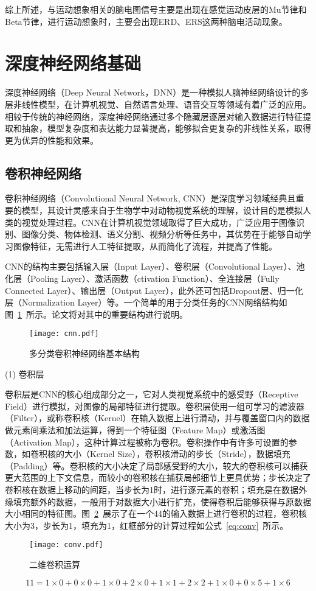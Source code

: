 综上所述，与运动想象相关的脑电图信号主要是出现在感觉运动皮层的Mu节律和Beta节律，进行运动想象时，主要会出现ERD、ERS这两种脑电活动现象。

\section{深度神经网络基础}

深度神经网络（Deep Neural Network，DNN）是一种模拟人脑神经网络设计的多层非线性模型，在计算机视觉、自然语言处理、语音交互等领域有着广泛的应用。相较于传统的神经网络，深度神经网络通过多个隐藏层逐层对输入数据进行特征提取和抽象，模型复杂度和表达能力显著提高，能够拟合更复杂的非线性关系，取得更为优异的性能和效果。

\subsection{卷积神经网络}

卷积神经网络（Convolutional Neural Network, CNN）是深度学习领域经典且重要的模型，其设计灵感来自于生物学中对动物视觉系统的理解，设计目的是模拟人类的视觉处理过程。CNN在计算机视觉领域取得了巨大成功，广泛应用于图像识别、图像分类、物体检测、语义分割、视频分析等任务中，其优势在于能够自动学习图像特征，无需进行人工特征提取，从而简化了流程，并提高了性能。

CNN的结构主要包括输入层（Input Layer）、卷积层（Convolutional Layer）、池化层（Pooling Layer）、激活函数（ctivation Function）、全连接层（Fully Connected Layer）、输出层（Output Layer），此外还可包括Dropout层、归一化层（Normalization Layer）等。一个简单的用于分类任务的CNN网络结构如图~\ref{fig:cnn}~所示。论文将对其中的重要结构进行说明。
\begin{figure}
    \centering
    \texttt{[image: cnn.pdf]}
    \caption{多分类卷积神经网络基本结构}
    \label{fig:cnn}
\end{figure}

(1) 卷积层

卷积层是CNN的核心组成部分之一，它对人类视觉系统中的感受野（Receptive Field）进行模拟，对图像的局部特征进行提取。卷积层使用一组可学习的滤波器（Filter），或称卷积核（Kernel）在输入数据上进行滑动，并与覆盖窗口内的数据做元素间乘法和加法运算，得到一个特征图（Feature Map）或激活图（Activation Map），这种计算过程被称为卷积。卷积操作中有许多可设置的参数，如卷积核的大小（Kernel Size），卷积核滑动的步长（Stride），数据填充（Padding）等。卷积核的大小决定了局部感受野的大小，较大的卷积核可以捕获更大范围的上下文信息，而较小的卷积核在捕获局部细节上更具优势；步长决定了卷积核在数据上移动的间距，当步长为1时，进行逐元素的卷积；填充是在数据外缘填充额外的数据，一般用于对数据大小进行扩充，使得卷积后能够获得与原数据大小相同的特征图。图~\ref{fig:conv}~展示了在一个4\times4的输入数据上进行卷积的过程，卷积核大小为3，步长为1，填充为1，红框部分的计算过程如公式~\ref{eq:conv}~所示。
\begin{figure}
    \centering
    \texttt{[image: conv.pdf]}
    \caption{二维卷积运算}
    \label{fig:conv}
\end{figure}
\begin{equation}
    11=1\times0+0\times0+1\times0+2\times0+1\times1+2\times2+1\times0+0\times5+1\times6
    \label{eq:conv}
\end{equation}

